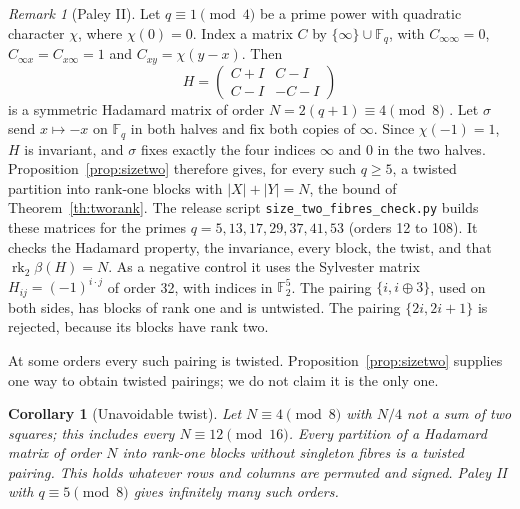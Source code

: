 \documentclass[11pt,reqno]{amsart}
\newtheorem{corollary}[theorem]{Corollary}
\theoremstyle{remark}\newtheorem{remark}[theorem]{Remark}
\begin{document}
\begin{remark}[Paley II]
Let \(q\equiv1\pmod 4\) be a prime power with quadratic character \(\chi\), where \(\chi(0)=0\). Index a matrix \(C\) by \(\{\infty\}\cup\mathbb F_q\), with \(C_{\infty\infty}=0\), \(C_{\infty x}=C_{x\infty}=1\) and \(C_{xy}=\chi(y-x)\). Then
\[
 H=\begin{pmatrix}C+I&C-I\\ C-I&-C-I\end{pmatrix}
\]
is a symmetric Hadamard matrix of order \(N=2(q+1)\equiv4\pmod 8\) \cite{paley}. Let \(\sigma\) send \(x\mapsto-x\) on \(\mathbb F_q\) in both halves and fix both copies of \(\infty\). Since \(\chi(-1)=1\), \(H\) is invariant, and \(\sigma\) fixes exactly the four indices \(\infty\) and \(0\) in the two halves. Proposition~\ref{prop:sizetwo} therefore gives, for every such \(q\ge5\), a twisted partition into rank-one blocks with \(|X|+|Y|=N\), the bound of Theorem~\ref{th:tworank}. The release script \texttt{size\_two\_fibres\_check.py} builds these matrices for the primes \(q=5,13,17,29,37,41,53\) (orders 12 to 108). It checks the Hadamard property, the invariance, every block, the twist, and that \(\operatorname{rk}_2\beta(H)=N\). As a negative control it uses the Sylvester matrix \(H_{ij}=(-1)^{i\cdot j}\) of order 32, with indices in \(\mathbb F_2^5\). The pairing \(\{i,i\oplus3\}\), used on both sides, has blocks of rank one and is untwisted. The pairing \(\{2i,2i+1\}\) is rejected, because its blocks have rank two.
\end{remark}

At some orders every such pairing is twisted. Proposition~\ref{prop:sizetwo} supplies one way to obtain twisted pairings; we do not claim it is the only one.

\begin{corollary}[Unavoidable twist]\label{cor:twist}
Let \(N\equiv4\pmod 8\) with \(N/4\) not a sum of two squares; this includes every \(N\equiv12\pmod{16}\). Every partition of a Hadamard matrix of order \(N\) into rank-one blocks without singleton fibres is a twisted pairing. This holds whatever rows and columns are permuted and signed. Paley II with \(q\equiv5\pmod 8\) gives infinitely many such orders.
\end{corollary}
\end{document}
